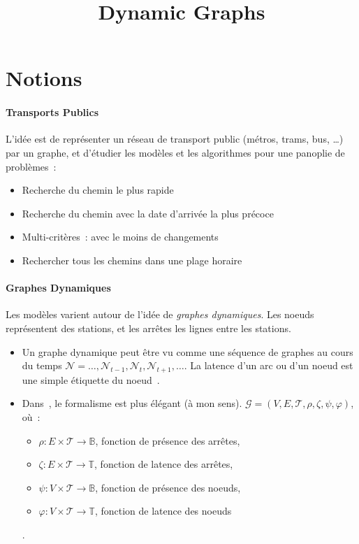\documentclass[11pt,a4paper]{article}
\title{Dynamic Graphs}
\begin{document}
\section{Notions}

\paragraph{Transports Publics}
L'idée est de représenter un réseau de transport public (métros,
trams, bus, …) par un graphe, et d'étudier les modèles et les
algorithmes pour une panoplie de problèmes~:
\begin{itemize}
\item Recherche du chemin le plus rapide
\item Recherche du chemin avec la date d'arrivée la plus précoce
\item Multi-critères~: avec le moins de changements
\item Rechercher tous les chemins dans une plage horaire
\end{itemize}


\paragraph{Graphes Dynamiques}
Les modèles varient autour de l'idée de \textit{graphes
  dynamiques}. Les noeuds représentent des stations, et les arrêtes
les lignes entre les stations.

\begin{itemize}
\item Un graphe dynamique peut être vu comme une séquence de graphes
  au cours du temps \(\mathcal{N} = \dots, \mathcal{N}_{t-1},
  \mathcal{N}_{t}, \mathcal{N}_{t+1}, \dots\). La latence d'un arc ou
  d'un noeud est une simple étiquette du noeud~\cite{xuan2003computing}.
\item Dans~\cite{casteigts2012time}, le formalisme est plus élégant (à
  mon sens).
  \(\mathcal{G} = (V, E, \mathcal{T}, \rho, \zeta, \psi, \varphi)\),
  où~:
  \begin{itemize}
  \item \(\rho : E \times \mathcal{T} \to \mathbb{B}\), fonction de
    présence des arrêtes,
  \item \(\zeta : E \times \mathcal{T} \to \mathbb{T}\), fonction de
    latence des arrêtes,
  \item \(\psi : V \times \mathcal{T} \to \mathbb{B}\), fonction de
    présence des noeuds,
  \item \(\varphi : V \times \mathcal{T} \to \mathbb{T}\), fonction de
    latence des noeuds
  \end{itemize}.
\end{itemize}
\end{document}
